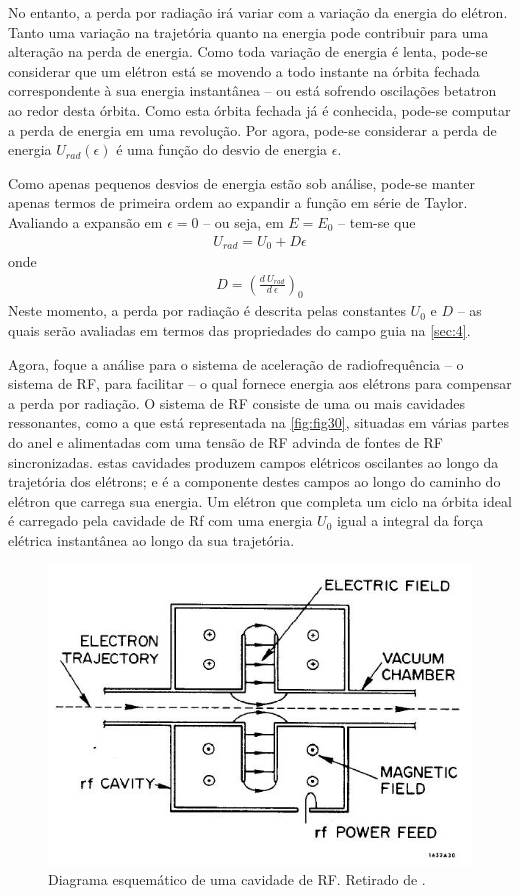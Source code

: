 No entanto, a perda por radiação irá variar com a variação da energia do elétron. Tanto uma variação na trajetória quanto na energia pode contribuir para uma alteração na perda de energia. Como toda variação de energia é lenta, pode-se considerar que um elétron está se movendo a todo instante na órbita fechada correspondente à sua energia instantânea -- ou está sofrendo oscilações betatron ao redor desta órbita. Como esta órbita fechada já é conhecida, pode-se computar a perda de energia em uma revolução. Por agora, pode-se considerar a perda de energia $U_{rad}(\epsilon)$ é uma função do desvio de energia $\epsilon$.

Como apenas pequenos desvios de energia estão sob análise, pode-se manter apenas termos de primeira ordem ao expandir a função em série de Taylor. Avaliando a expansão em $\epsilon=0$ -- ou seja, em $E=E_0$ -- tem-se que
\begin{align}
	U_{rad} = U_0 + D\epsilon\label{eq:3.23}
\end{align}
onde
\begin{align}
	D = \left(\frac{d\ U_{rad}}{d\ \epsilon}\right)_0
\end{align}
Neste momento, a perda por radiação é descrita pelas constantes $U_0$ e $D$ -- as quais serão avaliadas em termos das propriedades do campo guia na \autoref{sec:4}.

Agora, foque a análise para o sistema de aceleração de radiofrequência -- o sistema de RF, para facilitar -- o qual fornece energia aos elétrons para compensar a perda por radiação. O sistema de RF consiste de uma ou mais cavidades ressonantes, como a que está representada na \autoref{fig:fig30}, situadas em várias partes do anel e alimentadas com uma tensão de RF advinda de fontes de RF sincronizadas. estas cavidades produzem campos elétricos oscilantes ao longo da trajetória dos elétrons; e é a componente destes campos ao longo do caminho do elétron que carrega sua energia. Um elétron que completa um ciclo na órbita ideal é carregado pela cavidade de Rf com uma energia $U_0$ igual a integral da força elétrica instantânea ao longo da sua trajetória.

\begin{figure}[!htb]
	\centering
	\includegraphics[width=0.7\linewidth]{./Figuras/fig30.jpeg}
	\caption{Diagrama esquemático de uma cavidade de RF. Retirado de \cite{sands1970physics}.}
	\label{fig:fig30}
\end{figure}

